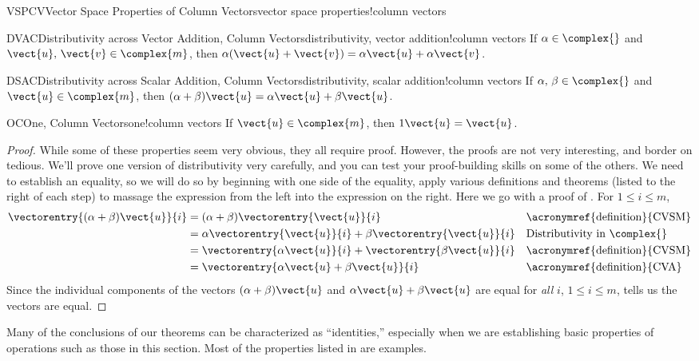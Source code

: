 \begin{theorem}{VSPCV}{Vector Space Properties of Column Vectors}{vector space properties!column vectors}
\begin{propertylist}
\begin{property}{DVAC}{Distributivity across Vector Addition, Column Vectors}{distributivity, vector addition!column vectors}
If $\alpha\in\complex{\null}$ and $\vect{u},\,\vect{v}\in\complex{m}$, then $\alpha(\vect{u}+\vect{v})=\alpha\vect{u}+\alpha\vect{v}$.\end{property}
%
\begin{property}{DSAC}{Distributivity across Scalar Addition, Column Vectors}{distributivity, scalar addition!column vectors}
If $\alpha,\,\beta\in\complex{\null}$ and $\vect{u}\in\complex{m}$, then
$(\alpha+\beta)\vect{u}=\alpha\vect{u}+\beta\vect{u}$.\end{property}
%
\begin{property}{OC}{One, Column Vectors}{one!column vectors}
If $\vect{u}\in\complex{m}$, then $1\vect{u}=\vect{u}$.\end{property}
%
\end{propertylist}
\end{theorem}
%
\begin{proof}
While some of these properties seem very obvious, they all require proof.  However, the proofs are not very interesting, and border on tedious. We'll prove one version of distributivity very carefully, and you can test your proof-building skills on some of the others.  We need to establish an equality, so we will do so by beginning with one side of the equality, apply various definitions and theorems (listed to the right of each step) to massage the expression from the left into the expression on the right.   Here we go with a proof of .   For $1\leq i\leq m$,
%
\begin{align*}
\vectorentry{(\alpha+\beta)\vect{u}}{i}
&=(\alpha+\beta)\vectorentry{\vect{u}}{i}
&&\text{\acronymref{definition}{CVSM}}\\
%
&=\alpha\vectorentry{\vect{u}}{i}+\beta\vectorentry{\vect{u}}{i}
&&\text{Distributivity in $\complex{\null}$}\\
%
&=\vectorentry{\alpha\vect{u}}{i}+\vectorentry{\beta\vect{u}}{i}
&&\text{\acronymref{definition}{CVSM}}\\
%
&=\vectorentry{\alpha\vect{u}+\beta\vect{u}}{i}
&&\text{\acronymref{definition}{CVA}}\\
%
\end{align*}
%
Since the individual components of the vectors $(\alpha+\beta)\vect{u}$ and $\alpha\vect{u}+\beta\vect{u}$ are equal for {\em all} $i$, $1\leq i\leq m$,  tells us the vectors are equal.
%
\end{proof}
%
Many of the conclusions of our theorems can be characterized as ``identities,''  especially when we are establishing basic properties of operations such as those in this section.  Most of the properties listed in  are examples.

